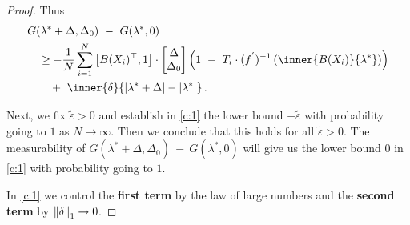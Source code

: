 \begin{proof}
Thus 
\begin{align}
  \label{c:1}
  \begin{split}
     &
   G
     (
     \lambda^*
      +
      \Delta
      ,
     \Delta_0
     )
     \ 
     -
     \ 
     G
     (
     \lambda^*,
     0
     )
     \\
     &
     \quad
     \ge
     -
     \frac{1}{N}
     \sum_{i=1}^{N} 
     \left[ 
       B(X_i)^\top,
       1
     \right]
     \cdot
     \begin{bmatrix}
       \Delta\\
       \Delta_0
     \end{bmatrix}
     \left( 
       1
       \ 
       -
       \ 
     T_i
     \cdot
     (f^{'})^{-1}
     \left( 
       \inner
       {B(X_i)}
       {\lambda^*}
     \right)
     \right)
     \\
     &
     \qquad
     +
     \ 
     \inner
     {\delta}
     {
       |\lambda^*+\Delta|
       -
       |\lambda^*|
     }
     \,.
   \end{split}
\end{align}

Next, we fix $
\tilde{\varepsilon}
>0
$
and establish in \eqref{c:1} the lower bound
$
-
\tilde{\varepsilon}
$
with probability going to $1$ as $N\to\infty$.
Then we conclude that this holds for all $\tilde{\varepsilon}>0$.
The measurability of
$
G
     (
     \lambda^*
      +
      \Delta
      ,
     \Delta_0
     )
     \ 
     -
     \ 
     G
     (
     \lambda^*,
     0
     )
$
will give us the lower bound 0 in \eqref{c:1} with probability going to $1$.

In \eqref{c:1} we control the \textbf{first term} by the law of large numbers 
and the \textbf{second term} by $\left\lVert\delta\right\rVert_1\to 0$.

\end{proof}
